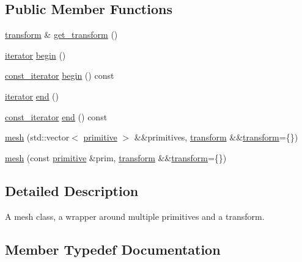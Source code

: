 \subsection*{Public Member Functions}
\begin{DoxyCompactItemize}
\item 
\mbox{\hyperlink{classmoka_1_1transform}{transform}} \& \mbox{\hyperlink{classmoka_1_1mesh_a4068a7137917249d32c521d58c5754c4}{get\+\_\+transform}} ()
\item 
\mbox{\hyperlink{classmoka_1_1mesh_a89827e48d6ebf6481c9a923042324756}{iterator}} \mbox{\hyperlink{classmoka_1_1mesh_a603006cd6a0e1fdf3ea52f7e5e4b1a94}{begin}} ()
\item 
\mbox{\hyperlink{classmoka_1_1mesh_aea68be7cc8e79b9825775f199562bf90}{const\+\_\+iterator}} \mbox{\hyperlink{classmoka_1_1mesh_a7be30acdc08f2cae714a95e18e94babb}{begin}} () const
\item 
\mbox{\hyperlink{classmoka_1_1mesh_a89827e48d6ebf6481c9a923042324756}{iterator}} \mbox{\hyperlink{classmoka_1_1mesh_aa42c177ac5f937f9de4e01efc79d9bc0}{end}} ()
\item 
\mbox{\hyperlink{classmoka_1_1mesh_aea68be7cc8e79b9825775f199562bf90}{const\+\_\+iterator}} \mbox{\hyperlink{classmoka_1_1mesh_a13510c06aa885a3fa1cb8eb3d998a67b}{end}} () const
\item 
\mbox{\hyperlink{classmoka_1_1mesh_a915acb830920bfea3dbae1d343048ada}{mesh}} (std\+::vector$<$ \mbox{\hyperlink{classmoka_1_1primitive}{primitive}} $>$ \&\&primitives, \mbox{\hyperlink{classmoka_1_1transform}{transform}} \&\&\mbox{\hyperlink{classmoka_1_1transform}{transform}}=\{\})
\item 
\mbox{\hyperlink{classmoka_1_1mesh_aa25225d3f0f48dad9367890e59fc5abb}{mesh}} (const \mbox{\hyperlink{classmoka_1_1primitive}{primitive}} \&prim, \mbox{\hyperlink{classmoka_1_1transform}{transform}} \&\&\mbox{\hyperlink{classmoka_1_1transform}{transform}}=\{\})
\end{DoxyCompactItemize}


\subsection{Detailed Description}
A mesh class, a wrapper around multiple primitives and a transform. 

\subsection{Member Typedef Documentation}
\mbox{\label{classmoka_1_1mesh_aea68be7cc8e79b9825775f199562bf90}} 
